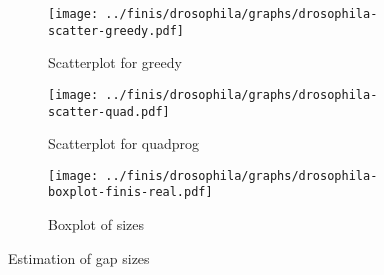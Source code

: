 \documentclass[12pt]{amsart}
\begin{document}
\begin{figure}[h!]
  \centering

    \begin{subfigure}{230pt}
    \centering
      \texttt{[image: ../finis/drosophila/graphs/drosophila-scatter-greedy.pdf]}
      \caption{Scatterplot for greedy}
    \end{subfigure}%
    \begin{subfigure}{230pt}
      \texttt{[image: ../finis/drosophila/graphs/drosophila-scatter-quad.pdf]}
      \caption{Scatterplot for quadprog}
    \end{subfigure}

    \begin{subfigure}{400pt}
      \texttt{[image: ../finis/drosophila/graphs/drosophila-boxplot-finis-real.pdf]}
      \caption{Boxplot of sizes}
    \end{subfigure}

  \caption{Estimation of gap sizes}
\end{figure}
\end{document}
